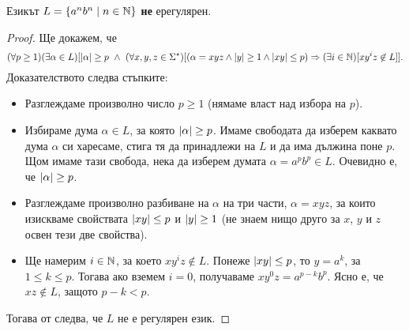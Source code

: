 \begin{example}
  Езикът $L = \{a^nb^n \mid n\in \mathbb{N}\}$ {\bf не} ерегулярен.
\end{example}
\begin{proof}
  Ще докажем, че
  {\scriptsize
    \[(\forall p \geq 1)(\exists \alpha \in L)[\lvert{\alpha}\rvert \geq p\ \wedge\ (\forall x,y,z\in\Sigma^\star)[(\alpha = xyz \wedge \lvert{y}\rvert \geq 1\wedge \lvert{xy}\rvert \leq p) \Rightarrow (\exists i\in\mathbb{N})[xy^iz \not\in L]].\]}
  Доказателството следва стъпките:
  \begin{itemize}
  \item 
    Разглеждаме произволно число $p \geq 1$ (нямаме власт над избора на $p$).
  \item
    Избираме дума $\alpha \in L$, за която $\lvert{\alpha}\rvert \geq p$. Имаме свободата да изберем каквато дума $\alpha$
    си харесаме, стига тя да принадлежи на $L$ и да има дължина поне $p$.
    Щом имаме тази свобода, нека да изберем думата $\alpha = a^pb^p \in L$.
    Очевидно е, че $\lvert{\alpha}\rvert \geq p$.
  \item
    Разглеждаме произволно разбиване на $\alpha$ на три части, $\alpha = xyz$,
    за които изискваме свойствата $\lvert{xy}\rvert \leq p$ и $\lvert{y}\rvert \geq 1$ (не знаем нищо друго за $x$, $y$ и $z$ освен тези две свойства).
  \item
    Ще намерим $i\in\mathbb{N}$, за което $xy^iz \not\in L$.
    Понеже $\lvert{xy}\rvert \leq p$, то $y = a^k$, за  $1\leq k \leq p$.
    Тогава ако вземем $i = 0$, получаваме $xy^0z = a^{p-k}b^p$.
    Ясно е, че $xz \not\in L$, защото $p-k < p$.
  \end{itemize}  
  Тогава от  следва, че $L$ не е регулярен език.
\end{proof}

